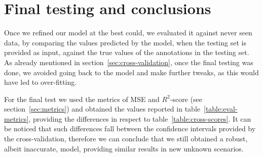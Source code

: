 \section{Final testing and conclusions}\label{sec:conclusions}

Once we refined our model at the best could, we evaluated it against never seen data, by comparing the values predicted by the model, when the testing set is provided as input, against the true values of the annotations in the testing set. As already mentioned in section~\ref{sec:cross-validation}, once the final testing was done, we avoided going back to the model and make further tweaks, as this would have led to over-fitting.

\begin{table}
	\centering
	\caption{Final evaluation metrics}
	\label{table:eval-metrics}
\end{table}

For the final test we used the metrics of MSE and $R^2$-score (see section~\ref{sec:metrics}) and obtained the values reported in table~\ref{table:eval-metrics}, providing the differences in respect to table~\ref{table:cross-scores}. It can be noticed that such differences fall between the confidence intervals provided by the cross-validation, therefore we can conclude that we still obtained a robust, albeit inaccurate, model, providing similar results in new unknown scenarios.

